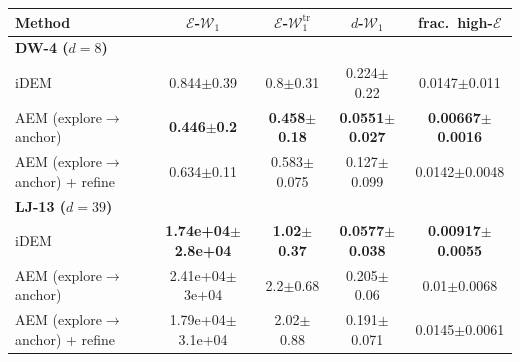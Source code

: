 \begin{tabular}{lcccc}
\toprule
Method & $\mathcal{E}$-$\mathcal{W}_1$ & $\mathcal{E}$-$\mathcal{W}_1^{\mathrm{tr}}$ & $d$-$\mathcal{W}_1$ & frac.\ high-$\mathcal{E}$ \\
\midrule
\multicolumn{5}{l}{\textbf{DW-4 ($d{=}8$)}}\\
iDEM & 0.844{\scriptsize$\pm$0.39} & 0.8{\scriptsize$\pm$0.31} & 0.224{\scriptsize$\pm$0.22} & 0.0147{\scriptsize$\pm$0.011} \\  %
AEM (explore$\to$anchor) & \textbf{0.446{\scriptsize$\pm$0.2}} & \textbf{0.458{\scriptsize$\pm$0.18}} & \textbf{0.0551{\scriptsize$\pm$0.027}} & \textbf{0.00667{\scriptsize$\pm$0.0016}} \\  %
AEM (explore$\to$anchor) + refine & 0.634{\scriptsize$\pm$0.11} & 0.583{\scriptsize$\pm$0.075} & 0.127{\scriptsize$\pm$0.099} & 0.0142{\scriptsize$\pm$0.0048} \\  %
\midrule
\multicolumn{5}{l}{\textbf{LJ-13 ($d{=}39$)}}\\
iDEM & \textbf{1.74e+04{\scriptsize$\pm$2.8e+04}} & \textbf{1.02{\scriptsize$\pm$0.37}} & \textbf{0.0577{\scriptsize$\pm$0.038}} & \textbf{0.00917{\scriptsize$\pm$0.0055}} \\  %
AEM (explore$\to$anchor) & 2.41e+04{\scriptsize$\pm$3e+04} & 2.2{\scriptsize$\pm$0.68} & 0.205{\scriptsize$\pm$0.06} & 0.01{\scriptsize$\pm$0.0068} \\  %
AEM (explore$\to$anchor) + refine & 1.79e+04{\scriptsize$\pm$3.1e+04} & 2.02{\scriptsize$\pm$0.88} & 0.191{\scriptsize$\pm$0.071} & 0.0145{\scriptsize$\pm$0.0061} \\  %
\bottomrule
\end{tabular}

